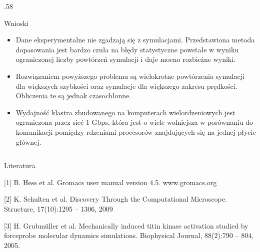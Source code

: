 \documentclass[final, t]{beamer} %
\begin{document}
\begin{frame}{}
\begin{columns}[T]
\begin{column} {.58\textwidth}
    \begin{block}{Wnioski}
    \vspace{10mm}
    \centering
         \begin{minipage}{0.97\textwidth}
    \begin{itemize}
    \item Dane eksperymentalne nie zgadzają się z symulacjami. Przedstawiona metoda dopasowania jest bardzo czuła na błędy statystyczne powstałe w wyniku ograniczonej liczby powtórzeń symulacji i daje mocno rozbieżne wyniki. 
    \item Rozwiązaniem powyższego problemu są wielokrotne powtórzenia symulacji dla większych szybkości oraz symulacje dla większego zakresu prędkości. Obliczenia te są jednak czasochłonne.

    \item Wydajność klastra zbudowanego na komputerach wielordzeniowych jest ograniczona przez sieć 1 Gbps, która jest o wiele wolniejsza w porównaniu do komunikacji pomiędzy rdzeniami procesorów znajdujących się na jednej płycie głównej.

    \end{itemize}
    \end{minipage}
    \vspace{10mm}
    \end{block}

    \end{column}
    \end{columns}
    \begin{block}{Literatura}
      \centering
         \begin{minipage}{0.97\textwidth}   
          [1] B. Hess et al.  Gromacs user manual version 4.5. www.gromacs.org
         
    [2] K. Schulten et al. Discovery Through the Computational Microscope. Structure, 17(10):1295 -- 1306, 2009

    
    [3] H. Grubmüller et al. Mechanically induced titin kinase activation studied by forceprobe molecular dynamics simulations. Biophysical Journal, 88(2):790 -- 804, 2005.

    


    \end{minipage}
    \end{block}
    \vfill
  \end{frame}
  
\end{document}
